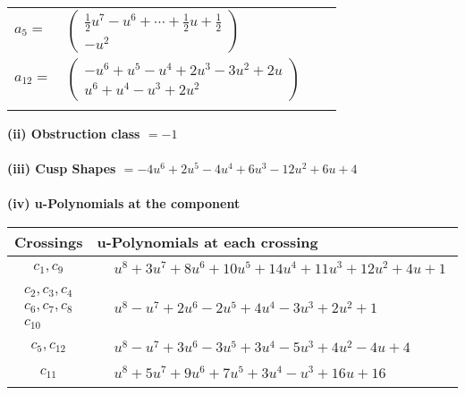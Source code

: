 \documentclass[1p]{elsarticle_modified}
\theoremstyle{definition}
\begin{document}
\begin{tabular}{m{7pt} m{180pt} m{7pt} m{180pt} }
\flushright $a_{5}=$&$\begin{pmatrix}\frac{1}{2} u^7- u^6+\cdots+\frac{1}{2} u+\frac{1}{2}\\- u^2\end{pmatrix}$ \\
\flushright $a_{12}=$&$\begin{pmatrix}- u^6+u^5- u^4+2 u^3-3 u^2+2 u\\u^6+u^4- u^3+2 u^2\end{pmatrix}$\\&\end{tabular}
\flushleft \textbf{(ii) Obstruction class $= -1$}\\~\\
\flushleft \textbf{(iii) Cusp Shapes $= -4 u^6+2 u^5-4 u^4+6 u^3-12 u^2+6 u+4$}\\~\\
\newpage\renewcommand{\arraystretch}{1}
\flushleft \textbf{(iv) u-Polynomials at the component}\newline \\
\begin{tabular}{m{50pt}|m{274pt}}
Crossings & \hspace{64pt}u-Polynomials at each crossing \\
\hline $$\begin{aligned}c_{1},c_{9}\end{aligned}$$&$\begin{aligned}
&u^8+3 u^7+8 u^6+10 u^5+14 u^4+11 u^3+12 u^2+4 u+1
\end{aligned}$\\
\hline $$\begin{aligned}c_{2},c_{3},c_{4}\\c_{6},c_{7},c_{8}\\c_{10}\end{aligned}$$&$\begin{aligned}
&u^8- u^7+2 u^6-2 u^5+4 u^4-3 u^3+2 u^2+1
\end{aligned}$\\
\hline $$\begin{aligned}c_{5},c_{12}\end{aligned}$$&$\begin{aligned}
&u^8- u^7+3 u^6-3 u^5+3 u^4-5 u^3+4 u^2-4 u+4
\end{aligned}$\\
\hline $$\begin{aligned}c_{11}\end{aligned}$$&$\begin{aligned}
&u^8+5 u^7+9 u^6+7 u^5+3 u^4- u^3+16 u+16
\end{aligned}$\\
\hline
\end{tabular}\\~\\
\end{document}
